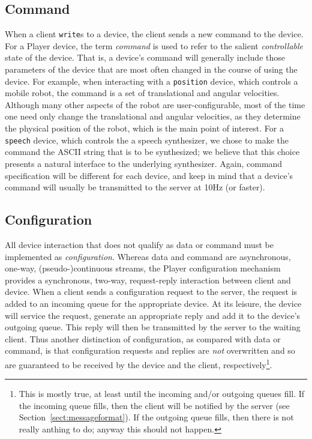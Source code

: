 \documentclass[11pt]{report}
\begin{document}
\subsection*{Command}
When a client {\tt write}s to a device, the client sends a new command to the
device.  For a Player device, the term {\em command} is used to refer to the
salient {\em controllable} state of the device.  That is, a device's command
will generally include those parameters of the device that are most often
changed in the course of using the device.  For example, when interacting
with a {\tt position} device, which controls a mobile robot, the command
is a set of translational and angular velocities.  Although many other aspects
of the robot are user-configurable, most of the time one need only change
the translational and angular velocities, as they determine the physical
position of the robot, which is the main point of interest.  For a {\tt
speech} device, which controls the a speech synthesizer, we chose to
make the command the ASCII string that is to be synthesized; we believe that
this choice presents a natural interface to the underlying synthesizer.  
Again, command specification will be different for each device, and keep
in mind that a device's command will usually be transmitted to the server
at 10Hz (or faster).

\subsection*{Configuration}
All device interaction that does not qualify as data or command must be
implemented as {\em configuration}.  Whereas data and command are asynchronous,
one-way, (pseudo-)continuous streams, the Player configuration mechanism
provides a synchronous, two-way, request-reply interaction between client and
device.  When a client sends a configuration request to the server, the request
is added to an incoming queue for the appropriate device.  At its leisure,
the device will service the request, generate an appropriate reply and add
it to the device's outgoing queue.  This reply will then be transmitted by
the server to the waiting client.  Thus another distinction of configuration,
as compared with data or command, is that configuration requests and replies
are {\em not} overwritten and so are guaranteed to be received by the device
and the client, respectively\footnote{This is mostly true, at least until the
incoming and/or outgoing queues fill.  If the incoming queue fills, then the
client will be notified by the server (see Section~\ref{sect:messageformat}).
If the outgoing queue fills, then there is not really anthing to do; anyway
this should not happen.}.
\end{document}

